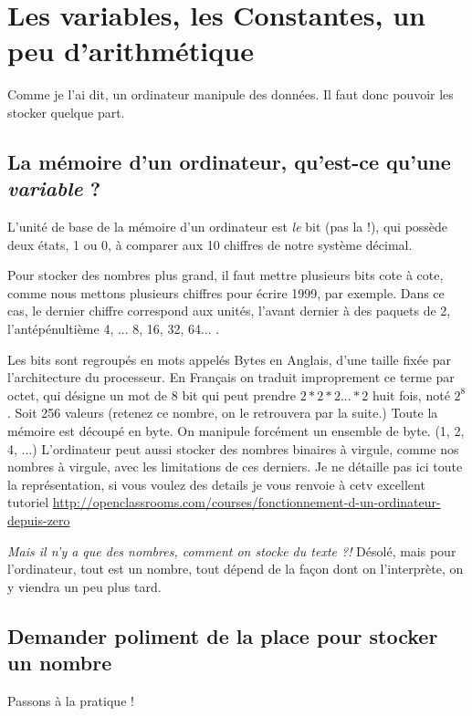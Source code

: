 \chapter{Les variables, les Constantes, un peu d'arithmétique}
Comme je l'ai dit, un ordinateur manipule des données. Il faut donc pouvoir les stocker
quelque part.
\section{La mémoire d'un ordinateur, qu'est-ce qu'une \emph{variable} ?}
L'unité de base de la mémoire d'un ordinateur est \emph{le} bit (pas la !), qui possède deux états,
1 ou 0, à comparer aux 10 chiffres de notre système décimal.

Pour stocker des nombres
plus grand, il faut mettre plusieurs bits cote à cote, comme nous mettons plusieurs chiffres
pour écrire 1999, par exemple. Dans ce cas, le dernier chiffre correspond aux unités, l'avant dernier à
des paquets de 2, l'antépénultième 4, ... 8, 16, 32, 64... .

Les bits sont regroupés en mots
appelés Bytes en Anglais, d'une taille fixée par l'architecture du processeur. En Français
on traduit improprement ce terme par octet, qui désigne un mot de 8 bit qui peut prendre
\begin{math}2*2*2...*2\end{math} huit fois, noté \begin{math} 2^{8} \end{math}. Soit 256 valeurs (retenez ce nombre, on le retrouvera par la suite.)
Toute la mémoire est découpé en byte. On manipule forcément un ensemble de byte. (1,
2, 4, ...)
L'ordinateur peut aussi stocker des nombres binaires à virgule, comme nos nombres à virgule, avec les limitations de ces derniers. Je ne détaille pas ici toute la représentation, si vous voulez des details je vous renvoie à cetv excellent tutoriel \url{http://openclassrooms.com/courses/fonctionnement-d-un-ordinateur-depuis-zero}

\emph{Mais il n'y a que des nombres, comment on stocke du texte ?!}
Désolé, mais pour l'ordinateur, tout est un nombre, tout dépend de la façon dont on
l'interprète, on y viendra un peu plus tard.
\section{Demander poliment de la place pour stocker un nombre}
Passons à la pratique !

